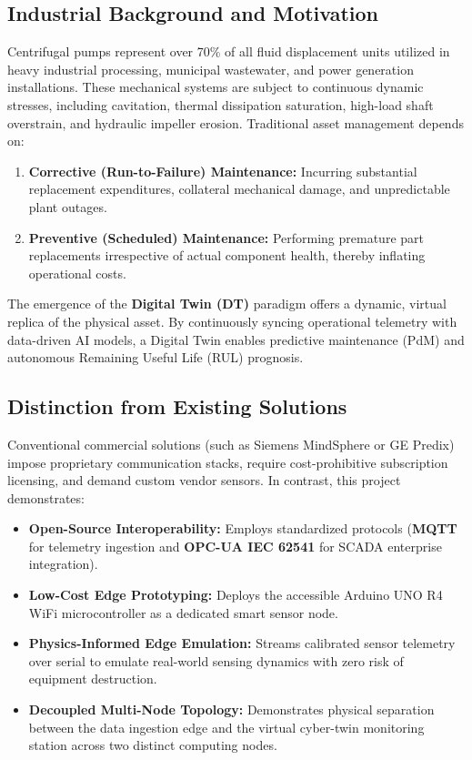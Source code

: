 \documentclass[11pt,a4paper]{article}
\begin{document}
\subsection{Industrial Background and Motivation}
Centrifugal pumps represent over 70\% of all fluid displacement units utilized in heavy industrial processing, municipal wastewater, and power generation installations. These mechanical systems are subject to continuous dynamic stresses, including cavitation, thermal dissipation saturation, high-load shaft overstrain, and hydraulic impeller erosion. Traditional asset management depends on:
\begin{enumerate}
    \item \textbf{Corrective (Run-to-Failure) Maintenance:} Incurring substantial replacement expenditures, collateral mechanical damage, and unpredictable plant outages.
    \item \textbf{Preventive (Scheduled) Maintenance:} Performing premature part replacements irrespective of actual component health, thereby inflating operational costs.
\end{enumerate}

The emergence of the \textbf{Digital Twin (DT)} paradigm offers a dynamic, virtual replica of the physical asset. By continuously syncing operational telemetry with data-driven AI models, a Digital Twin enables predictive maintenance (PdM) and autonomous Remaining Useful Life (RUL) prognosis.

\subsection{Distinction from Existing Solutions}
Conventional commercial solutions (such as Siemens MindSphere or GE Predix) impose proprietary communication stacks, require cost-prohibitive subscription licensing, and demand custom vendor sensors. In contrast, this project demonstrates:
\begin{itemize}
    \item \textbf{Open-Source Interoperability:} Employs standardized protocols (\textbf{MQTT} for telemetry ingestion and \textbf{OPC-UA IEC 62541} for SCADA enterprise integration).
    \item \textbf{Low-Cost Edge Prototyping:} Deploys the accessible Arduino UNO R4 WiFi microcontroller as a dedicated smart sensor node.
    \item \textbf{Physics-Informed Edge Emulation:} Streams calibrated sensor telemetry over serial to emulate real-world sensing dynamics with zero risk of equipment destruction.
    \item \textbf{Decoupled Multi-Node Topology:} Demonstrates physical separation between the data ingestion edge and the virtual cyber-twin monitoring station across two distinct computing nodes.
\end{itemize}
\end{document}
